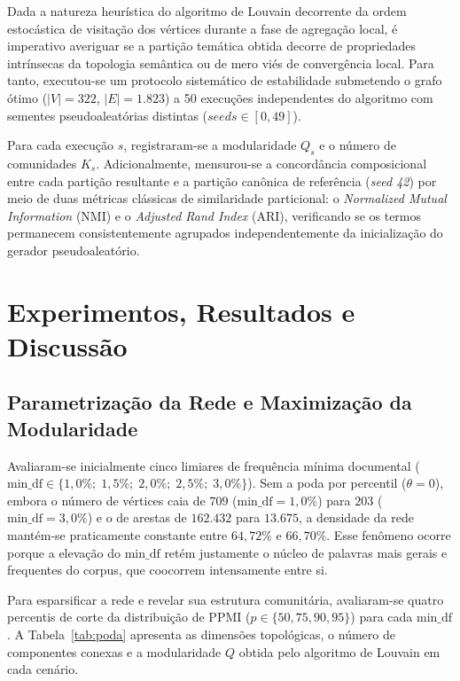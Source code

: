 \documentclass[12pt]{article}
\begin{document}
Dada a natureza heurística do algoritmo de Louvain decorrente da ordem estocástica de visitação dos vértices durante a fase de agregação local, é imperativo averiguar se a partição temática obtida decorre de propriedades intrínsecas da topologia semântica ou de mero viés de convergência local. Para tanto, executou-se um protocolo sistemático de estabilidade submetendo o grafo ótimo ($|V| = 322$, $|E| = 1.823$) a 50 execuções independentes do algoritmo com sementes pseudoaleatórias distintas ($\textit{seeds} \in [0, 49]$).

Para cada execução $s$, registraram-se a modularidade $Q_s$ e o número de comunidades $K_s$. Adicionalmente, mensurou-se a concordância composicional entre cada partição resultante e a partição canônica de referência (\textit{seed 42}) por meio de duas métricas clássicas de similaridade particional: o \textit{Normalized Mutual Information} (NMI) e o \textit{Adjusted Rand Index} (ARI), verificando se os termos permanecem consistentemente agrupados independentemente da inicialização do gerador pseudoaleatório.

\section{Experimentos, Resultados e Discussão}

\subsection{Parametrização da Rede e Maximização da Modularidade}

Avaliaram-se inicialmente cinco limiares de frequência mínima documental ($\text{min\_df} \in \{1{,}0\%;\; 1{,}5\%;\; 2{,}0\%;\; 2{,}5\%;\; 3{,}0\%\}$). Sem a poda por percentil ($\theta = 0$), embora o número de vértices caia de $709$ ($\text{min\_df} = 1{,}0\%$) para $203$ ($\text{min\_df} = 3{,}0\%$) e o de arestas de $162.432$ para $13.675$, a densidade da rede mantém-se praticamente constante entre $64{,}72\%$ e $66{,}70\%$. Esse fenômeno ocorre porque a elevação do $\text{min\_df}$ retém justamente o núcleo de palavras mais gerais e frequentes do corpus, que coocorrem intensamente entre si.

Para esparsificar a rede e revelar sua estrutura comunitária, avaliaram-se quatro percentis de corte da distribuição de PPMI ($p \in \{50, 75, 90, 95\}$) para cada $\text{min\_df}$. A Tabela~\ref{tab:poda} apresenta as dimensões topológicas, o número de componentes conexas e a modularidade $Q$ obtida pelo algoritmo de Louvain em cada cenário.
\end{document}
